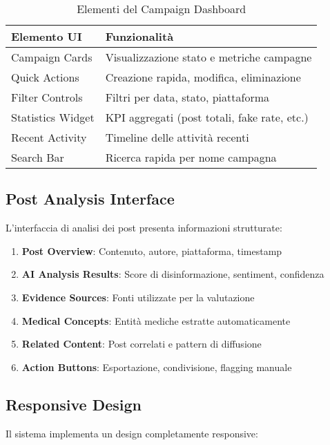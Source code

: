 \documentclass[12pt,a4paper]{report}
\begin{document}
\begin{table}[H]
\centering
\begin{tabular}{@{}ll@{}}
\toprule
\textbf{Elemento UI} & \textbf{Funzionalità} \\
\midrule
Campaign Cards & Visualizzazione stato e metriche campagne \\
Quick Actions & Creazione rapida, modifica, eliminazione \\
Filter Controls & Filtri per data, stato, piattaforma \\
Statistics Widget & KPI aggregati (post totali, fake rate, etc.) \\
Recent Activity & Timeline delle attività recenti \\
Search Bar & Ricerca rapida per nome campagna \\
\bottomrule
\end{tabular}
\caption{Elementi del Campaign Dashboard}
\label{tab:dashboard-elements}
\end{table}

\subsection{Post Analysis Interface}

L'interfaccia di analisi dei post presenta informazioni strutturate:

\begin{enumerate}
    \item \textbf{Post Overview}: Contenuto, autore, piattaforma, timestamp
    \item \textbf{AI Analysis Results}: Score di disinformazione, sentiment, confidenza
    \item \textbf{Evidence Sources}: Fonti utilizzate per la valutazione
    \item \textbf{Medical Concepts}: Entità mediche estratte automaticamente
    \item \textbf{Related Content}: Post correlati e pattern di diffusione
    \item \textbf{Action Buttons}: Esportazione, condivisione, flagging manuale
\end{enumerate}

\subsection{Responsive Design}

Il sistema implementa un design completamente responsive:
\end{document}
